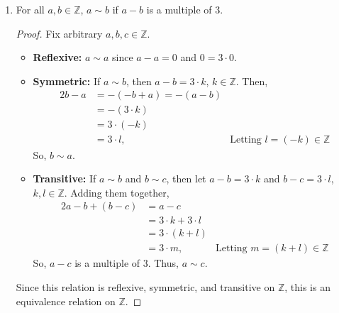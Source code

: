 \documentclass{article}
\begin{document}
\begin{enumerate}
\begin{enumerate}
			\item For all $a, b \in \mathbb{Z}$, $a \sim b$ if $a - b$ is a multiple of $3$.
                    \begin{proof} Fix arbitrary $a, b, c \in \mathbb{Z}$.
                        \begin{itemize}
                            \item \textbf{Reflexive:} $a \sim a$ since $a - a = 0$ and $0 = 3 \cdot 0$.
                            \item \textbf{Symmetric:} If $a \sim b$, then $a - b = 3\cdot k$, $k\in\mathbb{Z}$. Then, 
                                \begin{alignat*}{2}
                                    b - a &= \minus(\minus b + a) = \minus(a - b) \\
                                    &= \minus(3\cdot k) \\
                                    &= 3 \cdot (\minus k) \\
                                    &= 3 \cdot l\text{,}\qquad &\textrm{Letting $l = (\minus k)\in\mathbb{Z}$}
                                \end{alignat*}
                                So, $b \sim a$.
                                \item \textbf{Transitive:} If $a \sim b$ and $b \sim c$, then let $a - b = 3\cdot k$ and $b - c = 3\cdot l$, $k, l\in\mathbb{Z}$. Adding them together, 
                                \begin{alignat*}{2}
                                    a - b + (b - c) &= a - c \\
                                    &= 3\cdot k + 3\cdot l \\
                                    &= 3\cdot (k + l) \\
                                    &= 3\cdot m\text{,}\qquad &\textrm{Letting $m = (k + l)\in\mathbb{Z}$}
                                \end{alignat*}
                                So, $a - c$ is a multiple of 3. Thus, $a \sim c$.
                        \end{itemize}
                        Since this relation is reflexive, symmetric, and transitive on $\mathbb{Z}$, this is an equivalence relation on $\mathbb{Z}$.
                    \end{proof}
		\end{enumerate}
    \end{enumerate}
    
\end{document}
